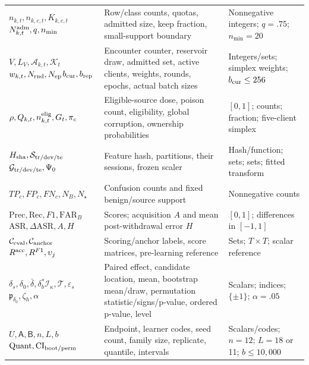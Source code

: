\documentclass[10pt,a4paper]{article}
\begin{document}
\begin{table}[htbp]
\begin{tabularx}{\linewidth}{L{3.3cm}Y L{4.4cm}}
$n_{k,t},n_{k,c,t},K_{k,c,t}$\newline $N^{\rm adm}_{k,t},q,n_{\min}$ & Row/class counts, quotas, admitted size, keep fraction, small-support boundary & Nonnegative integers; $q=.75$; $n_{\min}=20$\\
$V,L_V,\mathcal A_{k,t},\mathcal K_t$\newline $w_{k,t},N_{\rm rnd},N_{\rm ep}$\newline $b_{\rm cur},b_{\rm rep}$ & Encounter counter, reservoir draw, admitted set, active clients, weights, rounds, epochs, actual batch sizes & Integers/sets; simplex weights; $b_{\rm cur}\le256$\\
$\rho,Q_{k,t},n^{\rm elig}_{k,t},G_t,\pi_c$ & Eligible-source dose, poison count, eligibility, global corruption, ownership probabilities & $[0,1]$; counts; fraction; five-client simplex\\
$H_{\rm sha},\mathcal S_{\rm tr/dev/te}$\newline $\mathcal G_{\rm tr/dev/te},\Psi_0$ & Feature hash, partitions, their sessions, frozen scaler & Hash/function; sets; sets; fitted transform\\
$TP_c,FP_c,FN_c,N_B,N_\star$ & Confusion counts and fixed benign/source support & Nonnegative counts\\
$\mathrm{Prec},\mathrm{Rec},F1,\mathrm{FAR}_B$\newline $\mathrm{ASR},\Delta\mathrm{ASR},A,H$ & Scores; acquisition $A$ and mean post-withdrawal error $H$ & $[0,1]$; differences in $[-1,1]$\\
$\mathcal C_{\rm eval},\mathcal C_{\rm anchor}$\newline $R^{\rm acc},R^{F1},\upsilon_j$ & Scoring/anchor labels, score matrices, pre-learning reference & Sets; $T\!\times\!T$; scalar reference\\
$\delta_s,\delta_0,\bar\delta,\delta^*_b$\newline $\mathcal I_\kappa,\mathcal T,\varepsilon_s$\newline $\mathfrak p_{\delta_0},\zeta_h,\alpha$ & Paired effect, candidate location, mean, bootstrap mean/draw, permutation statistic/signs/p-value, ordered p-value, level & Scalars; indices; $\{\pm1\}$; $\alpha=.05$\\
$U,\mathsf A,\mathsf B,n,L,b$\newline $\operatorname{Quant},\mathrm{CI}_{\rm boot/perm}$ & Endpoint, learner codes, seed count, family size, replicate, quantile, intervals & Scalars/codes; $n=12$; $L=18$ or 11; $b\le10{,}000$\\

\end{tabularx}
\end{table}
\end{document}
